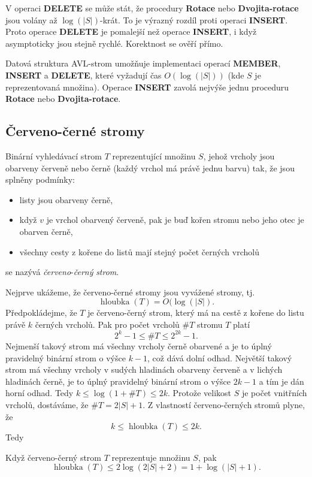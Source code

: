 \documentclass[a4paper,12pt]{article}
\DeclareMathOperator*{\hloubka}{hloubka}
\begin{document}
V operaci {\bf DELETE} se může stát, že procedury 
{\bf Rotace} nebo {\bf Dvojita-rotace} jsou volány až $\log(
|S|)$-krát. 
To je výrazný rozdíl proti operaci {\bf INSERT}. Proto operace 
{\bf DELETE} je pomalejší než operace {\bf INSERT}, i když 
asymptoticky jsou stejně rychlé. Korektnost se 
ověří přímo.

\begin{veta}Datová struktura AVL-strom 
umožňuje implementaci operací {\bf MEMBER}, {\bf INSERT} a 
{\bf DELETE}, které vyžadují čas $O(\log(|S|))$ (kde $
S$ je 
reprezentovaná množina).  Ope\-race {\bf INSERT} zavolá 
nejvýše jednu proceduru {\bf Rotace} nebo {\bf Dvo\-ji\-ta-rotace}.  
\end{veta}

\subsection{Červeno-černé stromy}

Binární vyhledávací strom $T$ reprezentující 
množinu $S$, jehož vrcholy jsou obarveny červeně nebo 
černě (každý vrchol má právě jednu barvu) tak, že jsou 
splněny podmínky:
\begin{itemize}
\item
listy jsou obarveny černě,
\item
když $v$ je vrchol obarvený červeně, pak je buď kořen 
stromu nebo jeho otec je obarven černě,
\item
všechny cesty z kořene do listů mají stejný 
počet čer\-ných vrcholů
\end{itemize}
se nazývá \emph{červeno}-\emph{černý} \emph{strom}. 

Nejprve ukážeme, že červeno-černé stromy jsou 
vyvážené stro\-my, tj. $$\hloubka(T)=O(\log(|S|).$$
Předpokládejme, že $T$ je červeno-černý strom, který má 
na cestě z kořene do listu právě $k$ černých 
vrcholů. Pak pro počet vrcholů $\#T$ 
stromu $T$ platí 
$$2^k-1\le \#T\le 2^{2k}-1.$$
Nejmenší takový strom má všechny vrcholy černě 
obarvené a je to úplný pravidelný binární strom o 
výšce $k-1$, což dává dolní odhad.  Největší takový 
strom má všechny vrcholy v sudých hladinách obarveny 
červeně a v lichých hladinách černě, je to úplný 
pravidelný binární strom o výšce $2k-1$ a tím je dán 
horní odhad. Tedy $k\le\log(1+\#T)\le 2k$.
Protože velikost $S$ je počet vnitřních vrcholů, 
dostáváme, že $\#T=2|S|+1$. Z vlastností červeno-černých 
stromů plyne, že 
$$k\le\hloubka(T)\le 2k.$$
Tedy

\begin{tvrzeni}Když červeno-černý strom $T$ 
reprezentuje množinu $S$, pak $$\hloubka(T)\le 2\log(2|S|+2)=1+\log(|S|+1).$$
\end{tvrzeni}
\end{document}
